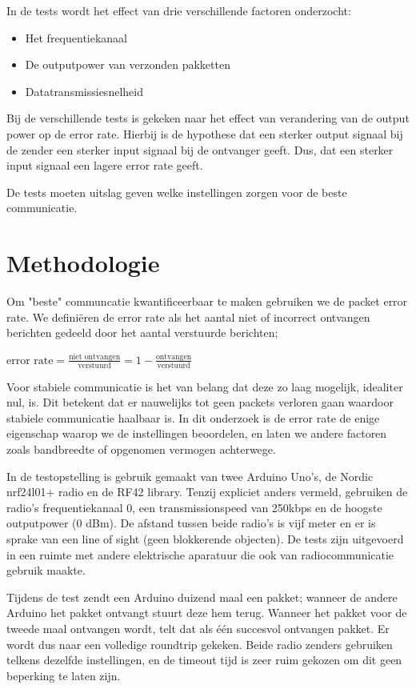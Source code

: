 \documentclass[a4paper,10pt]{article}
\begin{document}
In de tests wordt het effect van drie verschillende factoren onderzocht:
\begin{itemize}
    \item Het frequentiekanaal
    \item De outputpower van verzonden pakketten
    \item Datatransmissiesnelheid
\end{itemize}

Bij de verschillende tests is gekeken naar het effect van verandering van de output power op de error rate. Hierbij is de hypothese dat een sterker output signaal bij de zender een sterker input signaal bij de ontvanger geeft. Dus, dat een sterker input signaal een lagere error rate geeft.

De tests moeten uitslag geven welke instellingen zorgen voor de beste communicatie.

\section{Methodologie}
Om "beste" communcatie kwantificeerbaar te maken gebruiken we de packet error rate. We defini\"eren de error rate als het aantal niet of incorrect ontvangen berichten gedeeld door het aantal verstuurde berichten;

\begin{math}
    \text{error rate} = \frac{\text{niet ontvangen}}{\text{verstuurd}} = 1 - \frac{\text{ontvangen}}{\text{verstuurd}} 
\end{math}

Voor stabiele communicatie is het van belang dat deze zo laag mogelijk, idealiter nul, is. Dit betekent dat er nauwelijks tot geen packets verloren gaan waardoor stabiele communicatie haalbaar is. In dit onderzoek is de error rate de enige eigenschap waarop we de instellingen beoordelen, en laten we andere factoren zoals bandbreedte of opgenomen vermogen achterwege.

In de testopstelling is gebruik gemaakt van twee Arduino Uno's, de Nordic nrf24l01+ radio en de RF42 library. Tenzij expliciet anders vermeld, gebruiken de radio's frequentiekanaal 0, een transmissionspeed van 250kbps en de hoogste outputpower (0 dBm). De afstand tussen beide radio's is vijf meter en er is sprake van een line of sight (geen blokkerende objecten). De tests zijn uitgevoerd in een ruimte met andere elektrische aparatuur die ook van radiocommunicatie gebruik maakte.

Tijdens de test zendt een Arduino duizend maal een pakket; wanneer de andere Arduino het pakket ontvangt stuurt deze hem terug. Wanneer het pakket voor de tweede maal ontvangen wordt, telt dat als \'e\'en succesvol ontvangen pakket. Er wordt dus naar een volledige roundtrip gekeken. Beide radio zenders gebruiken telkens dezelfde instellingen, en de timeout tijd is zeer ruim gekozen om dit geen beperking te laten zijn.
\end{document}
